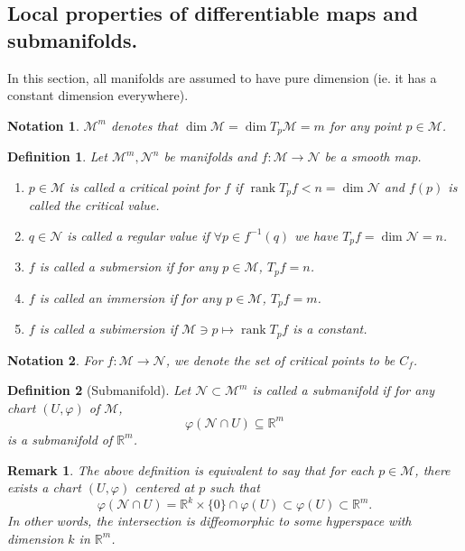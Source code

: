 \documentclass[10pt]{article}
\newtheorem{definition}{Definition}[section]
\newtheorem{notation}{Notation}[section]
\newtheorem{remark}{Remark}[section]
\DeclareMathOperator{\rank}{rank}
\newcommand{\R}[0]{\mathbb{R}}
\newcommand{\M}[0]{\mathcal{M}}
\newcommand{\maniN}[0]{\mathcal{N}}
\begin{document}
\subsection{Local properties of differentiable maps and submanifolds.}
In this section, all manifolds are assumed to have pure dimension (ie. it has a constant dimension everywhere). 
\begin{notation}
$\M^m$ denotes that $\dim\M = \dim T_p\M=m$ for any point $p\in\M$.
\end{notation}
\begin{definition}
  Let $\M^m,\maniN^n$ be manifolds and $f:\M\to\maniN$ be a smooth map.
  \begin{enumerate}[1).]
    \item $p\in\M$ is called a critical point for $f$ if $\rank T_pf<n=\dim\maniN$ and $f(p)$ is called the critical value.
    \item $q\in\maniN$ is called a regular value if $\forall p\in f^{-1}(q)$ we have $T_pf = \dim\maniN = n$. 
    \item $f$ is called a submersion if for any $p\in\M$, $T_pf = n$.
    \item $f$ is called an immersion if for any $p\in\M$, $T_pf = m$.
    \item $f$ is called a subimersion if $\M\ni p\mapsto\rank T_pf$ is a constant.
  \end{enumerate}
\end{definition}
\begin{notation}
  For $f:\M\to\maniN$, we denote the set of critical points to be $C_f$.
\end{notation}
\begin{definition}[Submanifold]
  Let $\maniN\subset\M^m$ is called a submanifold if for any chart $(U,\varphi)$ of $\M$, 
  \begin{equation*}
    \varphi(\maniN\cap U)\subseteq\R^m
  \end{equation*}
  is a submanifold of $\R^m$.
\end{definition}
\begin{remark}
  The above definition is equivalent to say that for each $p\in\M$, there exists a chart $(U,\varphi)$ centered at $p$ such that 
  \begin{equation*}
    \varphi(\maniN\cap U) = \R^k\times\{0\}\cap\varphi(U)\subset\varphi(U)\subset\R^m.
  \end{equation*}
  In other words, the intersection is diffeomorphic to some hyperspace with dimension $k$ in $\R^m$. 
\end{remark}
\end{document}
